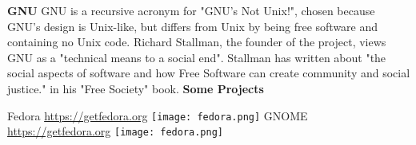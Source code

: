 \documentclass{article}
\begin{document}
 
\textbf{GNU} 
\vspace{1cm} GNU is a recursive acronym for "GNU's Not Unix!", chosen because GNU's design is Unix-like, but differs from Unix by being free software and containing no Unix code. Richard Stallman, the founder of the project, views GNU as a "technical means to a social end". Stallman has written about "the social aspects of software and how Free Software can create community and social justice." in his "Free Society" book. 
\vspace{1cm} 
\textbf{Some Projects} 
\begin{multicols}{2} Fedora \url{https://getfedora.org} 
\texttt{[image: fedora.png]} GNOME 
\url{https://getfedora.org} 
\texttt{[image: fedora.png]} \end{multicols} 
\end{document}
